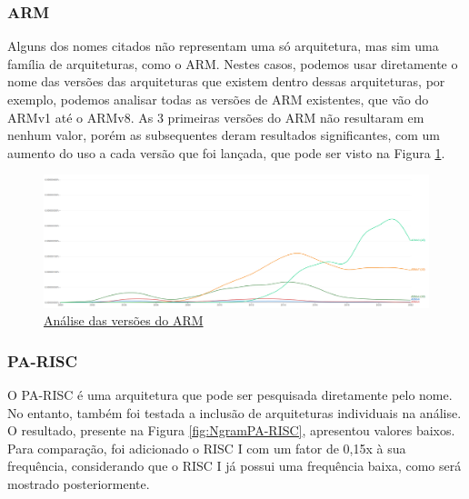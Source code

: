 \documentclass[
	article,			%
	11pt,				%
	oneside,			%
	a4paper,			%
	english,			%
	brazil,				%
	sumario=tradicional
	]{abntex2}
\begin{document}
\subsubsection{ARM}

Alguns dos nomes citados não representam uma só arquitetura, mas sim uma família de arquiteturas, como o ARM. Nestes casos, podemos usar diretamente o nome das versões das arquiteturas que existem dentro dessas arquiteturas, por exemplo, podemos analisar todas as versões de ARM existentes, que vão do ARMv1 até o ARMv8. As 3 primeiras versões do ARM não resultaram em nenhum valor, porém as subsequentes deram resultados significantes, com um aumento do uso a cada versão que foi lançada, que pode ser visto na Figura \ref{fig:NgramARM}.

\begin{figure}[H]
    \centering
    \includegraphics[width=1\linewidth]{Ngrams/ARM.png}
    \caption{\href{https://books.google.com/ngrams/graph?content=ARMv1\%2CARMv2\%2CARMv3\%2CARMv4\%2CARMv5\%2CARMv6\%2CARMv7\%2CARMv8&year_start=2000&year_end=2022&corpus=en&smoothing=1&case_insensitive=true}{Análise das versões do ARM}}
    \label{fig:NgramARM}
\end{figure}

\subsubsection{PA-RISC}

O PA-RISC é uma arquitetura que pode ser pesquisada diretamente pelo nome. No entanto, também foi testada a inclusão de arquiteturas individuais na análise. O resultado, presente na Figura \ref{fig:NgramPA-RISC}, apresentou valores baixos. Para comparação, foi adicionado o RISC I com um fator de 0,15x à sua frequência, considerando que o RISC I já possui uma frequência baixa, como será mostrado posteriormente.
\end{document}
